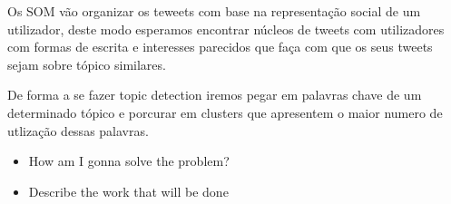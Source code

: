 Os SOM vão organizar os teweets com base na representação social de um utilizador, deste modo esperamos encontrar núcleos de tweets com utilizadores com formas de escrita e interesses parecidos que faça com  que os seus tweets sejam sobre tópico similares.

De forma a se fazer topic detection iremos pegar em palavras chave de um determinado tópico e porcurar em clusters que apresentem o maior numero de utlização dessas palavras.



\begin{itemize}
  \item How am I gonna solve the problem? 
  \item Describe the work that will be done 
\end{itemize}
